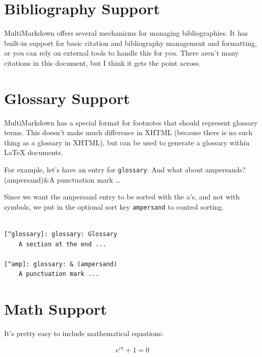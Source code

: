 \documentclass[oneside,article]{memoir}
\begin{document}
\section{Bibliography Support}
\label{bibliographysupport}

MultiMarkdown offers several mechanisms for managing bibliographies. It has
built-in support for basic citation and bibliography management and
formatting, or you can rely on external tools to handle this for you. There
aren't many citations in this document, but I think it gets the point
across.~\cite[p. 42]{fake}


\section{Glossary Support}
\label{glossarysupport}

MultiMarkdown has a special format for footnotes that should represent
glossary terms. This doesn't make much difference in XHTML (because there is
no such thing as a glossary in XHTML), but can be used to generate a glossary
within LaTeX documents.


For example, let's have an entry for \texttt{glossary}. And what about
ampersands?\glossary(ampersand){\&}{A punctuation mark {\ldots}}


Since we want the ampersand entry to be sorted with the a's, and not with
symbols, we put in the optional sort key \texttt{ampersand} to control sorting.


\begin{adjustwidth}{2.5em}{2.5em}
\begin{verbatim}

[^glossary]: glossary: Glossary 
    A section at the end ...

[^amp]: glossary: & (ampersand)
    A punctuation mark ...

\end{verbatim}
\end{adjustwidth}

\section{Math Support}
\label{mathsupport}

It's pretty easy to include mathematical equations:


\begin{equation}
\label{eulersidentity}
{e}^{i\pi }+1=0
\end{equation}
\end{document}
